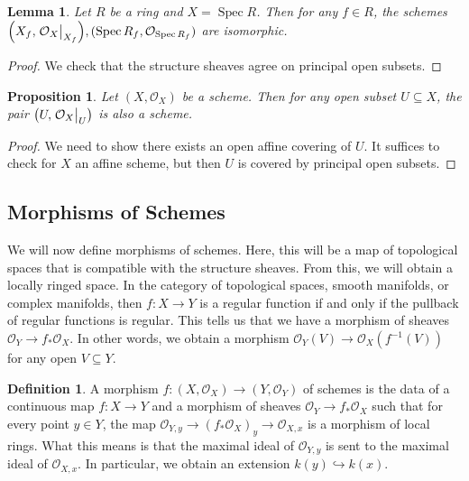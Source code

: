 \documentclass[leqno, openany]{memoir}
\newtheorem{prop}[thm]{Proposition}
\newtheorem{lem}[thm]{Lemma}
\theoremstyle{definition}
\newtheorem{defn}[thm]{Definition}
\theoremstyle{remark}
\theoremstyle{plain}
\theoremstyle{definition}
\theoremstyle{remark}
\newcommand{\mc}[1]{\mathcal{#1}}
\DeclareMathOperator{\Spec}{Spec}
\begin{document}
\begin{lem}
    Let $R$ be a ring and $X = \Spec R$. Then for any $f \in R$, the schemes $\qty(X_f, \eval{\mc{O}_X}_{X_f}), (\Spec R_f, \mc{O}_{\Spec R_f})$ are isomorphic.
\end{lem}

\begin{proof}
    We check that the structure sheaves agree on principal open subsets.
\end{proof}

\begin{prop}
    Let $(X, \mc{O}_X)$ be a scheme. Then for any open subset $U \subseteq X$, the pair $\qty(U, \eval{\mc{O}_X}_{U})$ is also a scheme.
\end{prop}

\begin{proof}
    We need to show there exists an open affine covering of $U$. It suffices to check for $X$ an affine scheme, but then $U$ is covered by principal open subsets.
\end{proof}

\subsection{Morphisms of Schemes}%
\label{sub:morphisms_of_schemes}

We will now define morphisms of schemes. Here, this will be a map of topological spaces that is compatible with the structure sheaves. From this, we will obtain a locally ringed space. In the category of topological spaces, smooth manifolds, or complex manifolds, then $f \colon X \to Y$ is a regular function if and only if the pullback of regular functions is regular. This tells us that we have a morphism of sheaves $\mc{O}_Y \to f_* \mc{O}_X$. In other words, we obtain a morphism $\mc{O}_Y(V) \to \mc{O}_X(f^{-1}(V))$ for any open $V \subseteq Y$.

\begin{defn}
    A morphism $f \colon (X, \mc{O}_X) \to (Y, \mc{O}_Y)$ of schemes is the data of a continuous map $f \colon X \to Y$ and a morphism of sheaves $\mc{O}_Y \to f_* \mc{O}_X$ such that for every point $y \in Y$, the map $\mc{O}_{Y,y} \to {(f_* \mc{O}_X)}_y \to \mc{O}_{X,x}$ is a morphism of local rings. What this means is that the maximal ideal of $\mc{O}_{Y,y}$ is sent to the maximal ideal of $\mc{O}_{X,x}$. In particular, we obtain an extension $k(y) \hookrightarrow k(x)$.
\end{defn}
\end{document}

